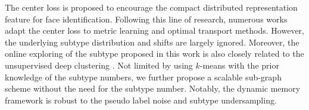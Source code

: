 The center loss \cite{wen2016discriminative} is proposed to encourage the compact distributed representation feature for face identification. Following this line of research, numerous works \cite{liu2017adaptive,liu2018adaptive,xu2020reliable,liu2019hard,liu2019dependency} adapt the center loss to metric learning and optimal transport methods. However, the underlying subtype distribution and shifts are largely ignored. Moreover, the online exploring of the subtype proposed in this work is also closely related to the unsupervised deep clustering \cite{caron2018deep}. Not limited by using $k$-means with the prior knowledge of the subtype numbers, we further propose a scalable sub-graph scheme without the need for the subtype number. Notably, the dynamic memory framework is robust to the pseudo label noise and subtype undersampling.

  


























